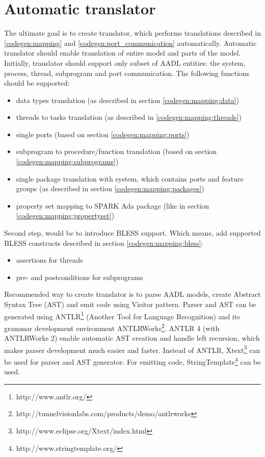 \section{Automatic translator}
\label{codegen:translator}

The ultimate goal is to create translator, which performs translations described in \ref{codegen:mapping} and \ref{codegen:port_communication} automatically. Automatic translator should enable translation of entire model and parts of the model. Initially, translator should support only subset of AADL entities: the system, process, thread, subprogram and port communication. The following functions should be supported:
\begin{itemize}
	\item data types translation (as described in section \ref{codegen:mapping:data})
	\item threads to tasks translation (as described in \ref{codegen:mapping:threads})
	\item single ports (based on section \ref{codegen:mapping:ports})
	\item subprogram to procedure/function translation (based on section \ref{codegen:mapping:subprograms})
	\item single package translation with system, which contains ports and feature groups (as described in section \ref{codegen:mapping:packages})
	\item property set mapping to SPARK Ada package (like in section \ref{codegen:mapping:propertyset})
\end{itemize}

Second step, would be to introduce BLESS support. Which means, add supported BLESS constructs described in section \ref{codegen:mapping:bless}:
\begin{itemize}
	\item assertions for threads
	\item pre- and postconditions for subprograms
\end{itemize}

Recommended way to create translator is to parse AADL models, create Abstract Syntax Tree (AST) and emit code using Visitor pattern. Parser and AST can be generated using ANTLR\footnote{http://www.antlr.org/} (Another Tool for Language Recognition) and its grammar development environment ANTLRWorks\footnote{http://tunnelvisionlabs.com/products/demo/antlrworks}. ANTLR 4 (with ANTLRWorks 2) enable automatic AST creation and handle left recursion, which makes parser development much easier and faster. Instead of ANTLR, Xtext\footnote{http://www.eclipse.org/Xtext/index.html} can be used for parser and AST generator. For emitting code, StringTemplate\footnote{http://www.stringtemplate.org/} can be used. 

